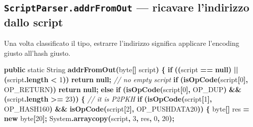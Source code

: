 \documentclass[
  italian,
  openany]{book}
\newenvironment{Shaded}{\begin{snugshade}}{\end{snugshade}}
\newcommand{\BuiltInTok}[1]{#1}
\newcommand{\CommentTok}[1]{\textcolor[rgb]{0.56,0.35,0.01}{\textit{#1}}}
\newcommand{\ControlFlowTok}[1]{\textcolor[rgb]{0.13,0.29,0.53}{\textbf{#1}}}
\newcommand{\DataTypeTok}[1]{\textcolor[rgb]{0.13,0.29,0.53}{#1}}
\newcommand{\DecValTok}[1]{\textcolor[rgb]{0.00,0.00,0.81}{#1}}
\newcommand{\FunctionTok}[1]{\textcolor[rgb]{0.13,0.29,0.53}{\textbf{#1}}}
\newcommand{\KeywordTok}[1]{\textcolor[rgb]{0.13,0.29,0.53}{\textbf{#1}}}
\newcommand{\NormalTok}[1]{#1}
\newcommand{\OperatorTok}[1]{\textcolor[rgb]{0.81,0.36,0.00}{\textbf{#1}}}
\begin{document}
\subsection{\texorpdfstring{\texttt{ScriptParser.addrFromOut} ---
ricavare l'indirizzo dallo
script}{ScriptParser.addrFromOut --- ricavare l'indirizzo dallo script}}\label{scriptparser.addrfromout-ricavare-lindirizzo-dallo-script}

Una volta classificato il tipo, estrarre l'indirizzo significa applicare
l'encoding giusto all'hash giusto.

\begin{Shaded}
\begin{Highlighting}[]
\KeywordTok{public} \DataTypeTok{static} \BuiltInTok{String} \FunctionTok{addrFromOut}\OperatorTok{(}\DataTypeTok{byte}\OperatorTok{[]}\NormalTok{ script}\OperatorTok{)} \OperatorTok{\{}
    \ControlFlowTok{if} \OperatorTok{((}\NormalTok{script }\OperatorTok{==} \KeywordTok{null}\OperatorTok{)} \OperatorTok{||} \OperatorTok{(}\NormalTok{script}\OperatorTok{.}\FunctionTok{length} \OperatorTok{\textless{}} \DecValTok{1}\OperatorTok{))} \ControlFlowTok{return} \KeywordTok{null}\OperatorTok{;}
    \CommentTok{// no empty script}
    \ControlFlowTok{if} \OperatorTok{(}\FunctionTok{isOpCode}\OperatorTok{(}\NormalTok{script}\OperatorTok{[}\DecValTok{0}\OperatorTok{],}\NormalTok{ OP\_RETURN}\OperatorTok{))}
        \ControlFlowTok{return} \KeywordTok{null}\OperatorTok{;}
    \ControlFlowTok{else} \ControlFlowTok{if} \OperatorTok{(}\FunctionTok{isOpCode}\OperatorTok{(}\NormalTok{script}\OperatorTok{[}\DecValTok{0}\OperatorTok{],}\NormalTok{ OP\_DUP}\OperatorTok{)} \OperatorTok{\&\&} \OperatorTok{(}\NormalTok{script}\OperatorTok{.}\FunctionTok{length} \OperatorTok{\textgreater{}=} \DecValTok{23}\OperatorTok{))} \OperatorTok{\{}
        \CommentTok{// it is P2PKH}
        \ControlFlowTok{if} \OperatorTok{(}\FunctionTok{isOpCode}\OperatorTok{(}\NormalTok{script}\OperatorTok{[}\DecValTok{1}\OperatorTok{],}\NormalTok{ OP\_HASH160}\OperatorTok{)} \OperatorTok{\&\&} \FunctionTok{isOpCode}\OperatorTok{(}\NormalTok{script}\OperatorTok{[}\DecValTok{2}\OperatorTok{],}\NormalTok{ OP\_PUSHDATA20}\OperatorTok{))} \OperatorTok{\{}
            \DataTypeTok{byte}\OperatorTok{[]}\NormalTok{ res }\OperatorTok{=} \KeywordTok{new} \DataTypeTok{byte}\OperatorTok{[}\DecValTok{20}\OperatorTok{];}
            \BuiltInTok{System}\OperatorTok{.}\FunctionTok{arraycopy}\OperatorTok{(}\NormalTok{script}\OperatorTok{,} \DecValTok{3}\OperatorTok{,}\NormalTok{ res}\OperatorTok{,} \DecValTok{0}\OperatorTok{,} \DecValTok{20}\OperatorTok{);}

\end{Highlighting}
\end{Shaded}
\end{document}
